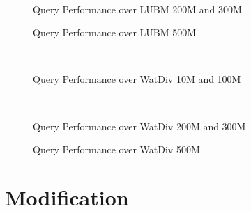 \documentclass[titlepage, a4paper, 12pt] {article}
\begin{document}
\begin{figure}[t]%
		\subfigure[lubm200M]{%
			\resizebox{\columnwidth}{!}{
				
			}
			\label{fig:lubm200MPerformance}%
		}%
			\\
			\subfigure[lubm300M]{%
				\resizebox{\columnwidth}{!}{
					
				}
				\label{fig:lubm300MPerformance}%
			}%
	\caption{Query Performance over LUBM 200M and 300M}%
	\label{fig:lubmPerformance2}
\end{figure}

\begin{figure}[t]%
	\subfigure[lubm500M]{%
		\resizebox{\columnwidth}{!}{
			
		}
		\label{fig:lubm500MPerformance}%
	}%
	\caption{Query Performance over LUBM 500M}%
	\label{fig:lubmPerformance3}
\end{figure}

\begin{figure}[t]%
	\subfigure[watdiv10M]{%
		\resizebox{\columnwidth}{!}{
			
		}
		\label{fig:watdiv10MPerformance}%
	}%
	\\
	\subfigure[watdiv100M]{%
		\resizebox{\columnwidth}{!}{
			
		}
		\label{fig:watdiv100MPerformance}%
	}%
	\caption{Query Performance over WatDiv 10M and 100M}%
	\label{fig:watdivPerformance1}
\end{figure}
	
	\begin{figure}[t]%
	\subfigure[watdiv200M]{%
		\resizebox{\columnwidth}{!}{
			
		}
		\label{fig:watdiv200MPerformance}%
	}%
	\\
	\subfigure[watdiv300M]{%
		\resizebox{\columnwidth}{!}{
			
		}
		\label{fig:watdiv300MPerformance}%
	}%
	\caption{Query Performance over WatDiv 200M and 300M}%
	\label{fig:watdivPerformance2}
\end{figure}

\begin{figure}[t]%
	\subfigure[watdiv500M]{%
		\resizebox{\columnwidth}{!}{
			
		}
		\label{fig:watdiv500MPerformance}%
	}%
	\caption{Query Performance over WatDiv 500M}%
	\label{fig:watdivPerformance3}
\end{figure}

\clearpage

\section{Modification}
\end{document}

